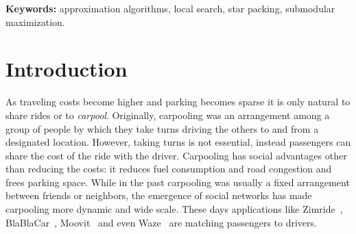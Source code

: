 \documentclass[11pt]{article}
\newcommand{\half}{\frac{1}{2}}
\newcommand{\inv}[1]{\frac{1}{#1}}
\newcommand{\carpool}{\textsc{Maximum Carpool Matching}\xspace}
\newcommand{\gcp}{\textsc{Maximum Group Carpool Matching}\xspace}
\newcommand{\cmax}{c_{\max}}
\newcommand{\eps}{\varepsilon}
\begin{document}
\begin{titlepage}
\begin{abstract}
We show that \carpool can be formulated as an unconstrained submodular
maximization problem, thus it admits a $\frac{1}{2}$-approximation
algorithm.  We show that the same formulation does not work for \gcp,
nevertheless, we present a local search $(\frac{1}{2}
- \eps)$-approximation algorithm for \gcp.
%
For the unweighted variant of both problems when the maximum possible
capacity, $\cmax$, is bounded by a constant, we provide a local search
$(\half + \inv{2\cmax} - \eps)$-approximation algorithm.  We also
provide an APX-hardness result, even if the maximum degree and $\cmax$
are at most $3$.
\end{abstract}



\medskip
\noindent
\textbf{Keywords:} approximation algorithms, local search, star
packing, submodular maximization.


\thispagestyle{empty}
\end{titlepage}


\section{Introduction}

As traveling costs become higher and parking becomes sparse it is only
natural to share rides or to \emph{carpool}.  Originally, carpooling
was an arrangement among a group of people by which they take turns
driving the others to and from a designated location.  However, taking
turns is not essential, instead passengers can share the cost of the
ride with the driver.  Carpooling has social advantages other than
reducing the costs: it reduces fuel consumption and road congestion
and frees parking space.  
%
While in the past carpooling was usually a fixed arrangement between
friends or neighbors, the emergence of social networks has made
carpooling more dynamic and wide scale.  These days applications like
Zimride~\cite{zimride}, BlaBlaCar~\cite{blablacar},
Moovit~\cite{moovit} and even Waze~\cite{waze} are matching passengers
to drivers.
\end{document}
